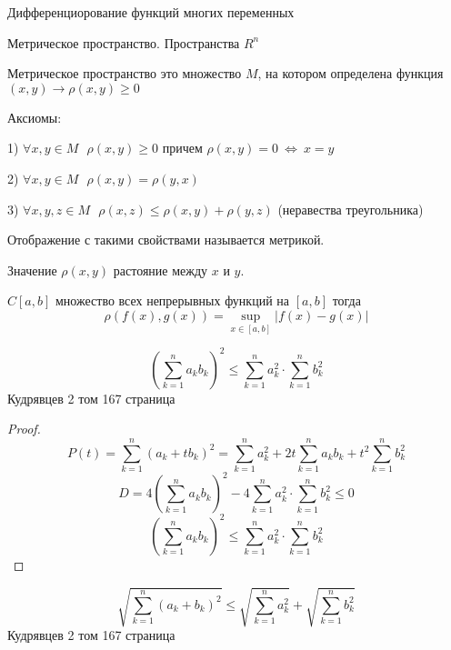 \begin{title}
  Дифференциорование функций многих переменных
\end{title}

\begin{title}[\Large]
  Метрическое пространство. Пространства $R^n$
\end{title}

\begin{define}
  Метрическое пространство это множество $M$, на котором определена функция
  $(x, y) \to \rho(x, y) \ge 0$

  Аксиомы:

  1) $\forall x,y \in M ~~~ \rho(x,y) \ge 0$ причем $\rho(x,y) = 0 ~
  \Leftrightarrow ~ x = y$

  2) $\forall x,y \in M ~~~ \rho(x,y) =\rho(y,x)$

  3) $\forall x,y,z \in M ~~~ \rho(x,z) \le \rho(x,y) + \rho(y,z)$
  (неравества треугольника)

  Отображение с такими свойствами называется метрикой.

  Значение $\rho(x,y)$ растояние между $x$ и $y$.
\end{define}

\begin{theorem}
  $C[a,b]$ множество всех непрерывных функций на $[a,b]$ тогда
  $$
  \rho(f(x), g(x)) = \sup_{x \in [a,b]} |f(x) - g(x)|
  $$
\end{theorem}

\begin{block}
  $$
  \left( \sum_{k=1}^n a_k b_k \right)^2 \le \sum_{k=1}^n a_k^2 \cdot
  \sum_{k=1}^n b_k^2
  $$
  Кудрявцев 2 том 167 страница
\end{block}

\begin{proof}
  $$
  P(t) = \sum_{k=1}^n (a_k + t b_k)^2 = \sum_{k=1}^n a_k^2 +
  2t\sum_{k=1}^n a_k b_k + t^2 \sum_{k=1}^n b_k^2
  $$
  $$
  D = 4\left( \sum_{k=1}^n a_k b_k \right)^2 - 4\sum_{k=1}^n a_k^2 \cdot
  \sum_{k=1}^n b_k^2 \le 0
  $$
  $$
  \left( \sum_{k=1}^n a_k b_k \right)^2 \le \sum_{k=1}^n a_k^2 \cdot
  \sum_{k=1}^n b_k^2
  $$
\end{proof}

\begin{block}
  $$
  \sqrt{\sum_{k=1}^n (a_k + b_k)^2} \le \sqrt{\sum_{k=1}^n a_k^2} +
  \sqrt{\sum_{k=1}^n b_k^2}
  $$
  Кудрявцев 2 том 167 страница
\end{block}

